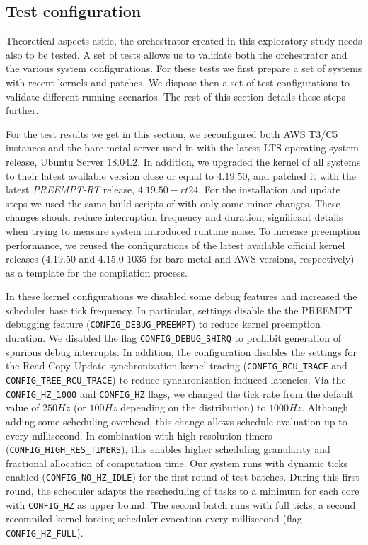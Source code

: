 \documentclass[]{scrartcl}
\begin{document}

\subsection{Test configuration}
\label{sub:testcfg}

Theoretical aspects aside, the orchestrator created in this exploratory study needs also to be tested.
A set of tests allows us to validate both the orchestrator and the various system configurations.
For these tests we first prepare a set of systems with recent kernels and patches.
We dispose then a set of test configurations to validate different running scenarios. 
The rest of this section details these steps further.

For the test results we get in this section, we reconfigured both AWS T3/C5 instances and the bare metal server used in \cite{Hoferetal2019} with the latest LTS operating system release, Ubuntu Server $18.04.2$.
In addition, we upgraded the kernel of all systems to their latest available version close or equal to $4.19.50$, and patched it with the latest \emph{PREEMPT-RT} release, $4.19.50-rt24$.
For the installation and update steps we used the same build scripts of \cite{Hoferetal2019} with only some minor changes.
These changes should reduce interruption frequency and duration, significant details when trying to measure system introduced runtime noise.
To increase preemption performance, we reused the configurations of the latest available official kernel releases (4.19.50 and 4.15.0-1035 for bare metal and AWS versions, respectively) as a template for the compilation process.

In these kernel configurations we disabled some debug features and increased the scheduler base tick frequency.
In particular, settings disable the the PREEMPT debugging feature (\texttt{CONFIG\_DEBUG\_PREEMPT}) to reduce kernel preemption duration.
We disabled the flag \texttt{CONFIG\_DEBUG\_SHIRQ} to prohibit generation of spurious debug interrupts.
In addition, the configuration disables the settings for the Read-Copy-Update synchronization kernel tracing  (\texttt{CONFIG\_RCU\_TRACE} and \texttt{CONFIG\_TREE\_RCU\_TRACE}) to reduce synchronization-induced latencies.
Via the \texttt{CONFIG\_HZ\_1000} and \texttt{CONFIG\_HZ} flags, we changed the tick rate from the default value of $250Hz$ (or $100Hz$ depending on the distribution) to $1000Hz$.
Although adding some scheduling overhead, this change allows schedule evaluation up to every millisecond. 
In combination with high resolution timers (\texttt{CONFIG\_HIGH\_RES\_TIMERS}), this enables higher scheduling granularity and fractional allocation of computation time.
Our system runs with dynamic ticks enabled (\texttt{CONFIG\_NO\_HZ\_IDLE}) for the first round of test batches.
During this first round, the scheduler adapts the rescheduling of tasks to a minimum for each core with \texttt{CONFIG\_HZ} as upper bound. 
The second batch runs with full ticks, a second recompiled kernel forcing scheduler evocation every millisecond (flag \texttt{CONFIG\_HZ\_FULL}).
\end{document}
